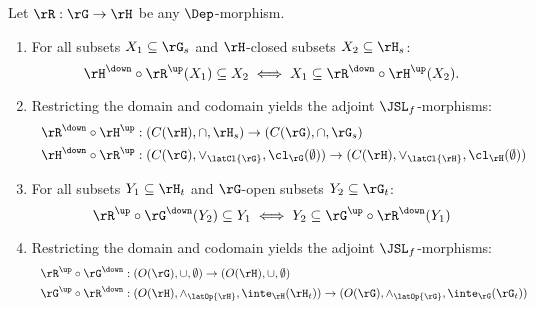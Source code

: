 \documentclass{article}
\begin{document}
\begin{lemma}
\label{lem:composite_adjoints}
Let $\rR : \rG \to \rH$ be any $\Dep$-morphism.
\begin{enumerate}
\item
For all subsets $X_1 \subseteq \rG_s$ and $\rH$-closed subsets $X_2 \subseteq \rH_s$:
\[
\rH^\down \circ \rR^\up(X_1) \subseteq X_2
\iff
X_1 \subseteq \rR^\down \circ \rH^\up(X_2).
\]
\item
Restricting the domain and codomain yields the adjoint $\JSL_f$-morphisms:
\[
\begin{tabular}{l}
$\rR^\down \circ \rH^\up : (C(\rH),\cap,\rH_s) \to (C(\rG),\cap,\rG_s)$
\\[1ex]
$\rH^\down \circ \rR^\up : (C(\rG),\lor_{\latCl{\rG}},\cl_\rG(\emptyset)) \to (C(\rH),\lor_{\latCl{\rH}},\cl_\rH(\emptyset))$
\end{tabular}
\]
\item
For all subsets $Y_1 \subseteq \rH_t$ and $\rG$-open subsets $Y_2 \subseteq  \rG_t$:
\[
\rR^\up \circ \rG^\down (Y_2) \subseteq Y_1
\iff
Y_2 \subseteq \rG^\up \circ \rR^\down (Y_1)
\]
\item
Restricting the domain and codomain yields the adjoint $\JSL_f$-morphisms:
\[
\begin{tabular}{l}
$\rR^\up \circ \rG^\down : (O(\rG),\cup,\emptyset) \to (O(\rH),\cup,\emptyset)$
\\[1ex]
$\rG^\up \circ \rR^\down : (O(\rH),\land_{\latOp{\rH}},\inte_\rH(\rH_t)) \to (O(\rG),\land_{\latOp{\rG}},\inte_\rG(\rG_t))$
\end{tabular}
\]
\end{enumerate}
\end{lemma}
\end{document}
